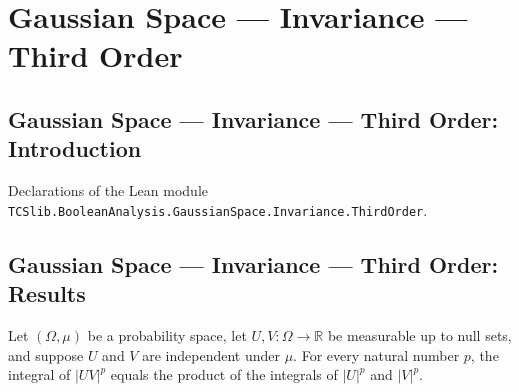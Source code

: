 \section{Gaussian Space --- Invariance --- Third Order}
\subsection*{Gaussian Space --- Invariance --- Third Order: Introduction}

Declarations of the Lean module \texttt{TCSlib.BooleanAnalysis.GaussianSpace.Invariance.ThirdOrder}.

\subsection*{Gaussian Space --- Invariance --- Third Order: Results}

\begin{lemma}
\label{BooleanAnalysis.GaussianSpace.Invariance.integral_abs_mul_pow}
\leanok
{}
Let $(\Omega,\mu)$ be a probability space, let $U,V:\Omega\to\mathbb R$ be measurable up
to null sets, and suppose $U$ and $V$ are independent under $\mu$. For every natural
number $p$, the integral of $|UV|^p$ equals the product of the integrals of $|U|^p$ and
$|V|^p$.
\end{lemma}

